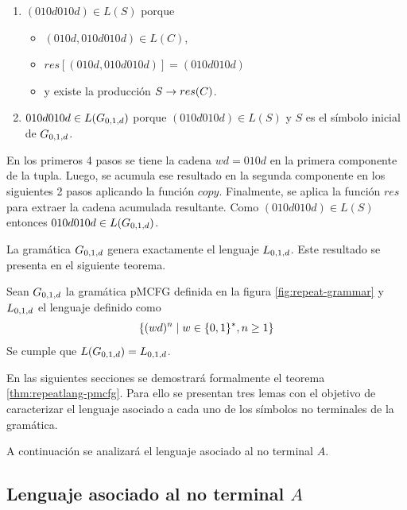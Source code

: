 \begin{enumerate}
\begin{itemize}
              \item $(010d, 010d) \in L(C)$,
              \item $copy[(010d, 010d)] = (010d, 010d010d)$
              \item y existe la producción $C \gprod copy(C)$.
          \end{itemize}
    \item $(010d010d) \in L(S)$ porque
          \begin{itemize}
              \item $(010d, 010d010d) \in L(C)$,
              \item $res[(010d, 010d010d)] = (010d010d)$
              \item y existe la producción $S \rightarrow res(C)$.
          \end{itemize}
    \item $010d010d \in L(G_{0, 1, d})$ porque $(010d010d) \in L(S)$ y $S$ es el símbolo inicial de $G_{0, 1, d}$.
\end{enumerate}

En los primeros 4 pasos se tiene la cadena $wd = 010d$ en la primera componente de la tupla. Luego, se acumula ese resultado en la segunda componente en los siguientes 2 pasos aplicando la función $copy$. Finalmente, se aplica la función $res$ para extraer la cadena acumulada resultante. Como $(010d010d) \in L(S)$ entonces $010d010d \in L(G_{0, 1, d})$.

La gramática $G_{0, 1, d}$ genera exactamente el lenguaje $L_{0,1,d}$. Este resultado se presenta en el siguiente teorema.

\begin{theorem}
    \label{thm:repeatlang-pmcfg}
    Sean $G_{0, 1, d}$ la gramática pMCFG definida en la figura \ref{fig:repeat-grammar} y $L_{0,1,d}$ el lenguaje definido como
    $$
        \{(wd)^n \;|\; w \in \{0, 1\}^*, n \geq 1\}
    $$
    Se cumple que $L(G_{0, 1, d}) = L_{0,1,d}$.
\end{theorem}

En las siguientes secciones se demostrará formalmente el teorema \ref{thm:repeatlang-pmcfg}. Para ello se presentan tres lemas con el objetivo de caracterizar el lenguaje asociado a cada uno de los símbolos no terminales de la gramática.

A continuación se analizará el lenguaje asociado al no terminal $A$.

\subsection*{Lenguaje asociado al no terminal $A$}

